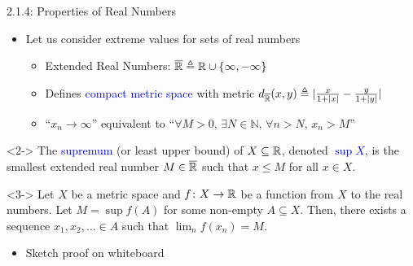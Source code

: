 \documentclass[10pt,english]{beamer}
\begin{document}
\begin{frame}{2.1.4: Properties of Real Numbers}

\begin{itemize}
\setlength\itemsep{3mm}
\item<1-> Let us consider extreme values for sets of real numbers \vspace{1mm}

\begin{itemize} 
  \setlength\itemsep{1.5mm}
  \item Extended Real Numbers: $\overline{\mathbb{R}} \triangleq \mathbb{R} \cup \{ \infty,-\infty\}$
  \item Defines \textcolor{blue}{compact metric space} with metric $d_{\overline{\mathbb{R}}} (x,y) \triangleq |\frac{x}{1+|x|} - \frac{y}{1+|y|}|$
  \item ``$x_n \to \infty$'' equivalent to ``$\forall M>0, \, \exists N\in \mathbb{N}, \, \forall n>N, \, x_n > M$''
\end{itemize}
\end{itemize}

\begin{definition}<2->
The \textcolor{blue}{supremum} (or least upper bound) of $X\subseteq \mathbb{R}$, denoted \textcolor{blue}{$\sup X$}, is the smallest extended real number $M \in \overline{\mathbb{R}}$ such that $x\leq M$ for all $x\in X$.
\end{definition}

\begin{lemma}<3->
Let $X$ be a metric space and $f \colon X\rightarrow \mathbb{R}$ be a function from $X$ to the real numbers.
Let $M = \sup f(A)$ for some non-empty $A \subseteq X$.
Then, there exists a sequence $x_1,x_2,\ldots \in A$ such that $\lim_n f(x_n) = M$.
\end{lemma}

\begin{itemize}
\item<4-> Sketch proof on whiteboard
\end{itemize}
  
\end{frame}
\end{document}
